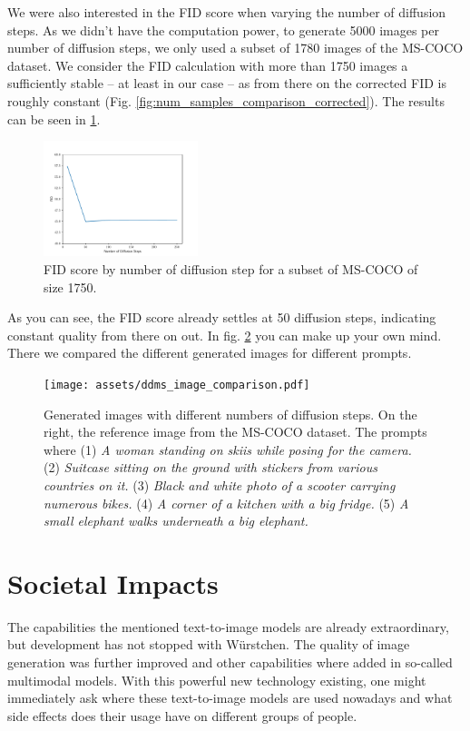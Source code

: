 \documentclass[11pt]{article}
\begin{document}
We were also interested in the FID score when varying the number of diffusion steps. As we didn't have the computation power, to generate 5000 images per number of diffusion steps, we only used a subset of 1780 images of the MS-COCO dataset. We consider the FID calculation with more than 1750 images a sufficiently stable – at least in our case – as from there on the corrected FID is roughly constant (Fig. \ref{fig:num_samples_comparison_corrected}). The results can be seen in \ref{fig:ddms_comparison}.
\begin{figure}[h]
    \centering
	\includegraphics[width=0.4\textwidth]{assets/ddms_comparison.pdf}
	\caption{FID score by number of diffusion step for a subset of MS-COCO of size 1750.}
	\label{fig:ddms_comparison}
\end{figure}

As you can see, the FID score already settles at 50 diffusion steps, indicating constant quality from there on out. In fig. \ref{fig:ddms_image_comparison} you can make up your own mind. There we compared the different generated images for different prompts.

\begin{figure}[h!]
    \centering
	\texttt{[image: assets/ddms\_image\_comparison.pdf]}
	\caption{Generated images with different numbers of diffusion steps. On the right, the reference image from the MS-COCO dataset. The prompts where (1) \textit{A woman standing on skiis while posing for the camera.} (2) \textit{Suitcase sitting on the ground with stickers from various countries on it.} (3) \textit{Black and white photo of a scooter carrying numerous bikes.} (4) \textit{A corner of a kitchen with a big fridge.} (5) \textit{A small elephant walks underneath a big elephant.}} 
	\label{fig:ddms_image_comparison}
\end{figure}


\newpage

\section{Societal Impacts}
The capabilities the mentioned text-to-image models are already extraordinary, but development has not stopped with Würstchen. The quality of image generation was further improved\cite{lin2023designbenchexploringbenchmarkingdalle} and other capabilities where added in so-called multimodal models\cite{yasunaga2022retrievalaugmentedmultimodellanguagemodeling}. With this powerful new technology existing, one might immediately ask where these text-to-image models are used nowadays and what side effects does their usage have on different groups of people.
\end{document}
